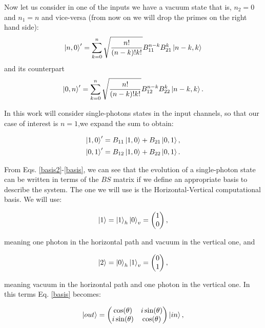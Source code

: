 \documentclass[12pt]{book}
\begin{document}
Now let us consider in one of the inputs we have a vacuum state that is, $n_{2}=0$ and $n_{1}=n$  and vice-versa (from now on we will drop the primes on the right hand side):
\begin{equation}
 \ket{n,0}'=\sum^{n}_{k=0} \sqrt{\frac{n!}{(n-k)!k!}} B_{11}^{n-k} B_{21}^{k} \ket{n-k,k}
\end{equation}
and its counterpart
\begin{equation}
     \ket{0,n}'=\sum^{n}_{k=0} \sqrt{\frac{n!}{(n-k)!k!}} B_{12}^{n-k} B_{22}^{k} \ket{n-k,k}.
\end{equation}

In this work will consider single-photons states in the input channels, so that our case of interest is $n=1$,we expand the sum to obtain:

\begin{align}
\ket{1,0}'=B_{11}\ket{1,0}+B_{21}\ket{0,1},\label{basis2} \\
\ket{0,1}'=B_{12}\ket{1,0}+B_{22}\ket{0,1}.
\label{basis}
\end{align}


From Eqs. \ref{basis2}-\ref{basis}, we can see that the evolution of a single-photon state can be written in terms of the $BS$ matrix if we define an appropriate basis to describe the system. The one we will use is the Horizontal-Vertical computational basis. We will use:

 \begin{equation}
 \ket{1}=\ket{1}_{h}\ket{0}_{v}=\begin{pmatrix} 1 \\0\end{pmatrix},
 \end{equation}

 meaning one photon in the horizontal path and vacuum in the vertical one, and
 
 \begin{equation}
 \ket{2}=\ket{0}_{h}\ket{1}_{v}=\begin{pmatrix} 0 \\1 \end{pmatrix},
 \end{equation}
 
meaning vacuum  in the horizontal path and one photon in the vertical one. In this terms Eq. \ref{basis} becomes:

\begin{equation}
\ket{out}=\begin{pmatrix} \cos(\theta) & i \sin(\theta) \\ i \sin(\theta) & \cos(\theta) \end{pmatrix} \ket{in},
\end{equation}
\end{document}
